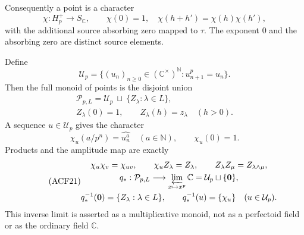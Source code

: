 Consequently a point is a character
\begin{equation}\tag{ACF17}
 \chi:H_p^+\longrightarrow S_{\mathbb C},\qquad
 \chi(0)=1,\quad \chi(h+h')=\chi(h)\chi(h'),
\end{equation}
with the additional source absorbing zero mapped to $\tau$.
The exponent $0$ and the absorbing zero are distinct source elements.

\begin{proposition}
Define
\begin{equation}\tag{ACF18}
 \mathcal U_p=
 \{(u_n)_{n\ge0}\in(\mathbb C^\times)^{\mathbb N}:
                                      u_{n+1}^p=u_n\}.
\end{equation}
Then the full monoid of points is the disjoint union
\begin{equation}\tag{ACF19}
 \begin{gathered}
 \mathcal P_{p,L}=\mathcal U_p\ \sqcup\ \{Z_\lambda:\lambda\in L\},\\
 Z_\lambda(0)=1,\qquad Z_\lambda(h)=z_\lambda\quad(h>0).
 \end{gathered}
\end{equation}
A sequence $u\in\mathcal U_p$ gives the character
\begin{equation}\tag{ACF20}
 \chi_u(a/p^n)=\widehat{u_n^a}\quad(a\in\mathbb N),
 \qquad \chi_u(0)=1.
\end{equation}
Products and the amplitude map are exactly
\begin{equation}\tag{ACF21}
 \begin{gathered}
 \chi_u\chi_v=\chi_{uv},\qquad
 \chi_u Z_\lambda=Z_\lambda,\qquad
 Z_\lambda Z_\mu=Z_{\lambda\wedge\mu},\\
 q_*:\mathcal P_{p,L}\longrightarrow
       \varprojlim_{x\mapsto x^p}\mathbb C
       =\mathcal U_p\sqcup\{\boldsymbol0\},\\
 q_*^{-1}(\boldsymbol0)=\{Z_\lambda:\lambda\in L\},\qquad
 q_*^{-1}(u)=\{\chi_u\}\quad(u\in\mathcal U_p).
 \end{gathered}
\end{equation}
This inverse limit is asserted as a multiplicative monoid, not as a
perfectoid field or as the ordinary field $\mathbb C$.
\end{proposition}
